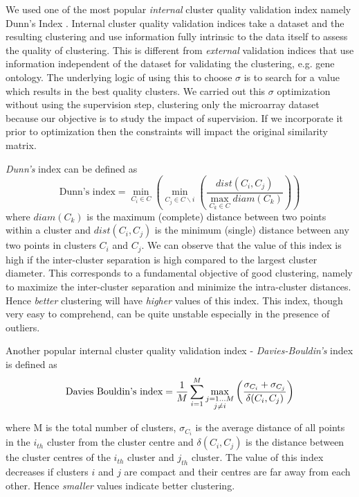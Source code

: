 We used one of the most popular \textit{internal} cluster quality validation index namely 
Dunn's Index \citep{Dunn1974wellseparated}. Internal cluster quality validation indices take a dataset and the resulting clustering and use information fully intrinsic 
to the data itself to assess the quality of clustering. This is different from \textit{external} validation indices that use information independent of the dataset for 
validating the clustering, e.g. gene ontology. The underlying logic of using this to choose $\sigma$ is to search for a value which results in the best quality 
clusters. We carried out this $\sigma$ optimization without using the supervision step, clustering only the microarray dataset because our objective is to study the 
impact of supervision. If we incorporate it prior to optimization then the constraints will impact the original similarity matrix.

\textit{Dunn's} index can be defined as 
\[
\text{Dunn's index}= \min_{C_{i}\in C} \left( \min_{C_{j} \in C \backslash i} \left( \frac{dist(C_{i},C_{j})}{\max_{C_{k}\in C}diam(C_{k})} \right) \right)
\]
where $diam(C_{k})$ is the maximum (complete) distance between two points within a cluster and $dist(C_{i},C_{j})$ is the minimum (single) distance between any two points in clusters $C_{i}$ and $C_{j}$. 
We can observe that the value of this index is high if the inter-cluster separation is high compared to the largest cluster diameter. 
This corresponds to a fundamental objective of good clustering, namely to maximize the inter-cluster separation and minimize the intra-cluster distances. 
Hence \textit{better} clustering will have \textit{higher} values of this index. This index, though very easy to comprehend, can be quite unstable especially in the presence of outliers. 

Another popular internal cluster quality validation index - \textit{Davies-Bouldin's} index is defined as
\[
\text{Davies Bouldin's index}=\frac{1}{M} \sum_{i=1}^{M}\max_{\begin{subarray}{c}j=1\dots M \\ j\neq i \end{subarray}} \left( \frac{\sigma_{C_{i}}+\sigma_{C_{j}}}{\delta(C_{i},C_{j})} \right)
\]

where M is the total number of clusters, $\sigma_{C_{i}}$ is the average distance of all points in the $i_{th}$ cluster from the cluster centre and $\delta(C_{i},C_{j})$ is the distance between the cluster centres of the $i_{th}$ cluster and $j_{th}$ cluster. 
The value of this index decreases if clusters $i$ and $j$ are compact and their centres are far away from each other. Hence \textit{smaller} values indicate better clustering.

